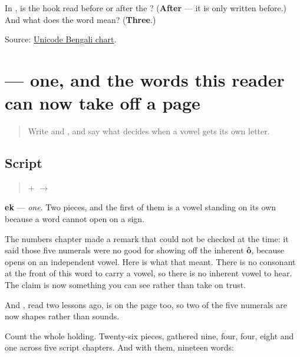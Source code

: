 \begin{tcolorbox}[breakable,colback=teal!4,colframe=teal!35!black,title={Before you move on}]
In \textbf{}, is the hook read before or after the \textbf{}? (\textbf{After} — it is only written before.) And what does the word mean? (\textbf{Three}.)

Source: \href{https://www.unicode.org/charts/PDF/U0980.pdf}{Unicode Bengali chart}.
\end{tcolorbox}
\section[ek]{ — one, and the words this reader can now take off a page}

\label{lesson:BN-W04-ek-read}



\begin{quote}
Write \textbf{} and \textbf{}, and say what decides when a vowel gets its own letter.
\end{quote}

\subsection*{Script}
\begin{quote}
\textbf{} + \textbf{} $\to$ \textbf{}
\end{quote}

\textbf{ek} — \emph{one}. Two pieces, and the first of them is a vowel standing on its own because a word cannot open on a sign.

The numbers chapter made a remark that could not be checked at the time: it said those five numerals were no good for showing off the inherent \textbf{ô}, because \textbf{} opens on an independent vowel. Here is what that meant. There is no consonant at the front of this word to carry a vowel, so there is no inherent vowel to hear. The claim is now something you can see rather than take on trust.

And \textbf{}, read two lessons ago, is on the page too, so two of the five numerals are now shapes rather than sounds.

Count the whole holding. Twenty-six pieces, gathered nine, four, four, eight and one across five script chapters. And with them, nineteen words:

